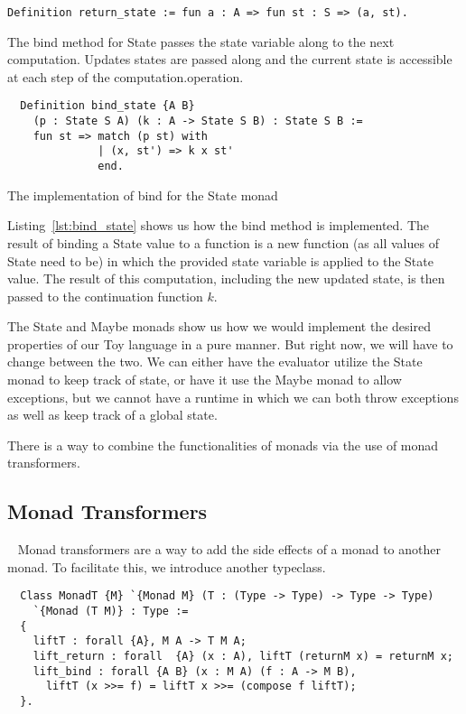 \begin{listing}[H]
\begin{verbatim}
Definition return_state := fun a : A => fun st : S => (a, st).
\end{verbatim}
\end{listing}

The bind method for State passes the state variable along to the next
computation. Updates states are passed along and the current state is
accessible at each step of the computation.operation.

\begin{listing}[H]
\begin{verbatim}
  Definition bind_state {A B} 
    (p : State S A) (k : A -> State S B) : State S B :=
    fun st => match (p st) with
              | (x, st') => k x st'
              end.
\end{verbatim}
\caption{The implementation of bind for the State monad}
\label{lst:bind_state}
\end{listing}

Listing~\ref{lst:bind_state} shows us how the bind method is implemented. The
result of binding a State value to a function is a new function (as all values
of State need to be) in which the provided state variable is applied to the
State value. The result of this computation, including the new updated state,
is then passed to the continuation function $k$.

The State and Maybe monads show us how we would implement the desired
properties of our Toy language in a pure manner. But right now, we will have to
change between the two. We can either have the evaluator utilize the State
monad to keep track of state, or have it use the Maybe monad to allow
exceptions, but we cannot have a runtime in which we can both throw exceptions
as well as keep track of a global state. 

There is a way to combine the functionalities of monads via the use of monad
transformers. 

\subsection{Monad Transformers}~\label{sec:monad_transformers}
Monad transformers are a way to add the side effects of a monad to another
monad. To facilitate this, we introduce another typeclass.

\begin{listing}
\begin{verbatim}
  Class MonadT {M} `{Monad M} (T : (Type -> Type) -> Type -> Type) 
    `{Monad (T M)} : Type :=
  {
    liftT : forall {A}, M A -> T M A;
    lift_return : forall  {A} (x : A), liftT (returnM x) = returnM x;
    lift_bind : forall {A B} (x : M A) (f : A -> M B),
      liftT (x >>= f) = liftT x >>= (compose f liftT);
  }.
\end{verbatim}
\end{listing}

